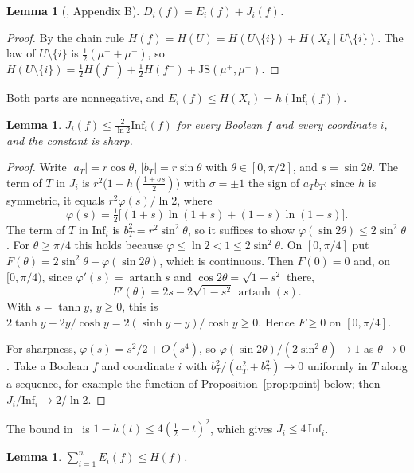 \documentclass[11pt]{amsart}
\newtheorem{lemma}[theorem]{Lemma}
\theoremstyle{remark}
\newcommand{\Inf}{\mathrm{Inf}}
\begin{document}
\begin{lemma}[\cite{GMP}, Appendix B]\label{lem:split}
$D_i(f)=E_i(f)+J_i(f)$.
\end{lemma}

\begin{proof}
By the chain rule $H(f)=H(U)=H(U\setminus\{i\})+H(X_i\mid U\setminus\{i\})$. The law of $U\setminus\{i\}$ is
$\tfrac12(\mu^++\mu^-)$, so $H(U\setminus\{i\})=\tfrac12H(f^+)+\tfrac12H(f^-)+\mathrm{JS}(\mu^+,\mu^-)$.
\end{proof}

Both parts are nonnegative, and $E_i(f)\le H(X_i)=h(\Inf_i(f))$.

\begin{lemma}\label{lem:jsd}
$J_i(f)\le \frac{2}{\ln 2}\Inf_i(f)$ for every Boolean $f$ and every coordinate $i$, and the constant is sharp.
\end{lemma}

\begin{proof}
Write $|a_T|=r\cos\theta$, $|b_T|=r\sin\theta$ with $\theta\in[0,\pi/2]$, and $s=\sin 2\theta$. The term of $T$ in
$J_i$ is $r^2\bigl(1-h(\tfrac{1+\sigma s}2)\bigr)$ with $\sigma=\pm1$ the sign of $a_Tb_T$; since $h$ is symmetric,
it equals $r^2\varphi(s)/\ln 2$, where
\[
\varphi(s)=\tfrac12\bigl[(1+s)\ln(1+s)+(1-s)\ln(1-s)\bigr].
\]
The term of $T$ in $\Inf_i$ is $b_T^2=r^2\sin^2\theta$, so it suffices to show $\varphi(\sin2\theta)\le 2\sin^2\theta$.
For $\theta\ge\pi/4$ this holds because $\varphi\le\ln2<1\le 2\sin^2\theta$. On $[0,\pi/4]$ put
$F(\theta)=2\sin^2\theta-\varphi(\sin 2\theta)$, which is continuous. Then $F(0)=0$ and, on $[0,\pi/4)$, since
$\varphi'(s)=\operatorname{artanh}s$ and $\cos2\theta=\sqrt{1-s^2}$ there,
\[
F'(\theta)=2s-2\sqrt{1-s^2}\,\operatorname{artanh}(s).
\]
With $s=\tanh y$, $y\ge0$, this is $2\tanh y-2y/\cosh y=2(\sinh y-y)/\cosh y\ge0$. Hence $F\ge0$ on
$[0,\pi/4]$.

For sharpness, $\varphi(s)=s^2/2+O(s^4)$, so $\varphi(\sin2\theta)/(2\sin^2\theta)\to1$ as $\theta\to0$. Take a
Boolean $f$ and coordinate $i$ with $b_T^2/(a_T^2+b_T^2)\to 0$ uniformly in $T$ along a sequence, for example the
function of Proposition~\ref{prop:point} below; then $J_i/\Inf_i\to 2/\ln 2$.
\end{proof}

The bound in~\cite[Lemma 8.1]{GMP} is $1-h(t)\le 4(\tfrac12-t)^2$, which gives $J_i\le 4\,\Inf_i$.

\begin{lemma}\label{lem:sum}
$\sum_{i=1}^n E_i(f)\le H(f)$.
\end{lemma}
\end{document}
